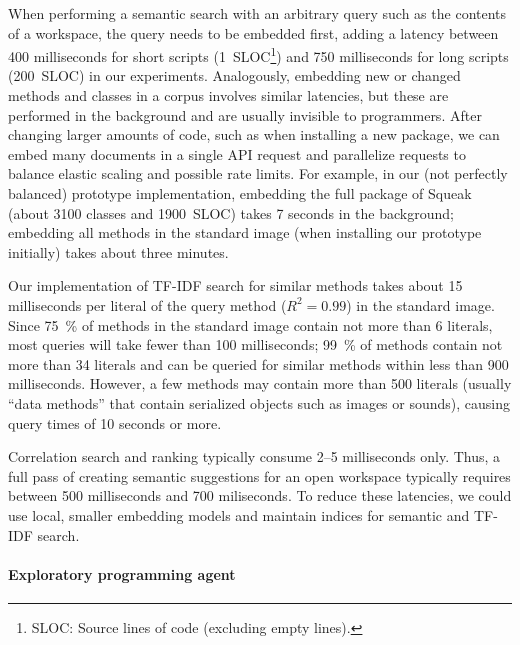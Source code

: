 When performing a semantic search with an arbitrary query such as the contents of a workspace, the query needs to be embedded first, adding a latency between 400 milliseconds for short scripts (\qty{1}{SLOC}\footnote{SLOC: Source lines of code (excluding empty lines).}) and 750 milliseconds for long scripts (\qty{200}{SLOC}) in our experiments.
Analogously, embedding new or changed methods and classes in a corpus involves similar latencies, but these are performed in the background and are usually invisible to programmers.
After changing larger amounts of code, such as when installing a new package, we can embed many documents in a single API request and parallelize requests to balance elastic scaling and possible rate limits.
For example, in our (not perfectly balanced) prototype implementation, embedding the full  package of Squeak (about \num{3100} classes and \qty{1900}{SLOC}) takes 7 seconds in the background; embedding all methods in the standard image (when installing our prototype initially) takes about three minutes.

Our implementation of TF-IDF search for similar methods takes about 15 milliseconds per literal of the query method ($R^2 = 0.99$) in the standard image.
Since \qty{75}{\percent} of methods in the standard image contain not more than 6 literals, most queries will take fewer than 100 milliseconds; \qty{99}{\percent} of methods contain not more than 34 literals and can be queried for similar methods within less than 900 milliseconds.
However, a few methods may contain more than 500 literals (usually ``data methods'' that contain serialized objects such as images or sounds), causing query times of 10 seconds or more.

Correlation search and ranking typically consume 2--5 milliseconds only.
Thus, a full pass of creating semantic suggestions for an open workspace typically requires between 500 milliseconds and 700 miliseconds.
To reduce these latencies, we could use local, smaller embedding models and maintain indices for semantic and TF-IDF search.

\paragraph{Exploratory programming agent}
\label{par:discussion/performance/latencies/agent}


